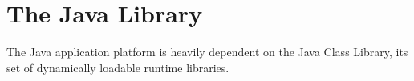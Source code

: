 \section {The Java Library}

The Java application platform is heavily dependent on the Java Class Library, its set of dynamically loadable runtime libraries.
